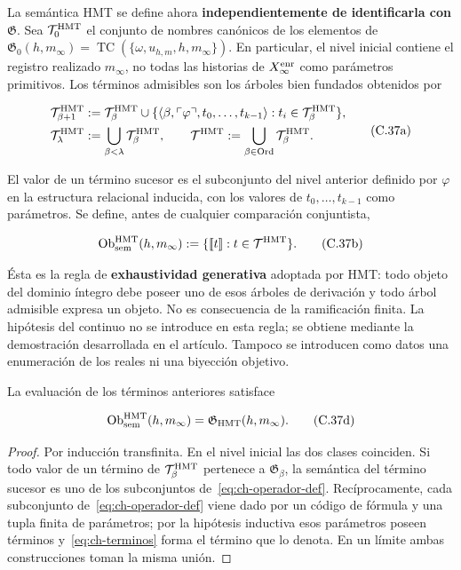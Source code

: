 La semántica HMT se define ahora \textbf{independientemente de identificarla con \(\mathfrak G\)}. Sea \(\mathcal T_0^{\rm HMT}\) el conjunto de nombres
canónicos de los elementos de
\(\mathfrak G_0(h,m_\infty)=
\operatorname{TC}(\{\omega,u_{h,m},h,m_\infty\})\). En particular, el nivel
inicial contiene el registro realizado \(m_\infty\), no todas las historias de
\(X_\infty^{\rm enr}\) como parámetros primitivos.
Los términos admisibles son los árboles bien fundados obtenidos por

\[
 \begin{aligned}
 \mathcal T^{\rm HMT}_{\beta+1}
 &:={\mathcal T}^{\rm HMT}_\beta\cup
 \{\langle\beta,\ulcorner\varphi\urcorner,
       t_0,\ldots,t_{k-1}\rangle:
       t_i\in\mathcal T^{\rm HMT}_\beta\},\\
 \mathcal T^{\rm HMT}_\lambda&:=
       \bigcup_{\beta<\lambda}\mathcal T^{\rm HMT}_\beta,
 \qquad
 \mathcal T^{\rm HMT}:=
       \bigcup_{\beta\in\operatorname{Ord}}\mathcal T^{\rm HMT}_\beta.
 \end{aligned}
\tag{C.37a}\label{eq:ch-terminos}
\]

El valor de un término sucesor es el subconjunto del nivel anterior definido
por \(\varphi\) en la estructura relacional inducida, con los valores de
\(t_0,\ldots,t_{k-1}\) como parámetros. Se define, antes de cualquier
comparación conjuntista,

\[
 \operatorname{Ob}_{\rm sem}^{\rm HMT}(h,m_\infty)
 :=\{\llbracket t\rrbracket:t\in\mathcal T^{\rm HMT}\}.
\tag{C.37b}\label{eq:ch-objetos-semanticos}
\]

Ésta es la regla de \textbf{exhaustividad generativa} adoptada por HMT: todo
objeto del dominio íntegro debe poseer uno de esos árboles de derivación y todo
árbol admisible expresa un objeto. No es consecuencia de la ramificación
finita. La hipótesis del continuo no se introduce en esta regla; se obtiene
mediante la demostración desarrollada en el artículo. Tampoco se introducen
como datos una enumeración de los reales ni una biyección objetivo.

\begin{theorem}
\label{thm:ch-6a}
La evaluación de
los términos anteriores satisface

\[
 \operatorname{Ob}_{\rm sem}^{\rm HMT}(h,m_\infty)
 =\mathfrak G_{\rm HMT}(h,m_\infty).
\tag{C.37d}\label{eq:ch-equivalencia-semantica}
\]

\end{theorem}
\begin{proof}
Por inducción transfinita. En el nivel inicial las dos clases
coinciden. Si todo valor de un término de
\(\mathcal T^{\rm HMT}_\beta\) pertenece a
\(\mathfrak G_\beta\), la semántica del término sucesor es uno de los
subconjuntos de~\eqref{eq:ch-operador-def}. Recíprocamente, cada subconjunto de~\eqref{eq:ch-operador-def} viene dado por
un código de fórmula y una tupla finita de parámetros; por la hipótesis
inductiva esos parámetros poseen términos y~\eqref{eq:ch-terminos} forma el término que lo
denota. En un límite ambas construcciones toman la misma unión.
\end{proof}

